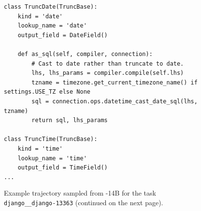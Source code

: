 \begin{figure}[!t]
\begin{tcolorbox}[colback=orange!5!white, colframe=orange!75!black, title={\small Observation 2 (Trimmed)}]
\begin{lstlisting}[basicstyle=\fontsize{7.5}{8.5}\ttfamily, breaklines=true]
class TruncDate(TruncBase):
    kind = 'date'
    lookup_name = 'date'
    output_field = DateField()

    def as_sql(self, compiler, connection):
        # Cast to date rather than truncate to date.
        lhs, lhs_params = compiler.compile(self.lhs)
        tzname = timezone.get_current_timezone_name() if settings.USE_TZ else None
        sql = connection.ops.datetime_cast_date_sql(lhs, tzname)
        return sql, lhs_params

class TruncTime(TruncBase):
    kind = 'time'
    lookup_name = 'time'
    output_field = TimeField()
...
\end{lstlisting}
\end{tcolorbox}
\caption{Example trajectory sampled from \methodname-14B for the task \texttt{django\_\_django-13363} (continued on the next page).}
\label{fig:traj_14B_p1}
\end{figure}
